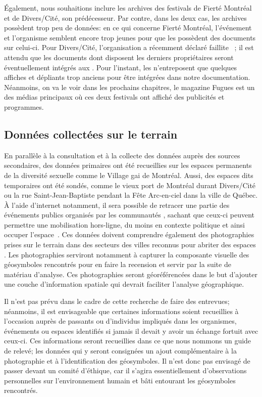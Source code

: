 Également, nous souhaitions inclure les archives des festivals de Fierté Montréal et de Divers/Cité, son prédécesseur. 
Par contre, dans les deux cas, les archives possèdent trop peu de données: en ce qui concerne Fierté Montréal, l'événement et l'organisme semblent encore trop jeunes pour que les \agq{} possèdent des documents sur celui-ci. 
Pour Divers/Cité, l'organisation a récemment déclaré faillite~\citep{Cormier2015} ; il est attendu que les documents dont disposent les derniers propriétaires seront éventuellement intégrés aux \agq{}. 
Pour l'instant, les \agq{} n'entreposent que quelques affiches et dépliants trop anciens pour être intégrées dans notre documentation. 
Néanmoins, on va le voir dans les prochains chapitres, le magazine Fugues est un des médias principaux où ces deux festivals ont affiché des publicités et programmes.

\subsection{Données collectées sur le terrain}
\label{sub:donnees_collectees_sur_le_terrain}
En parallèle à la consultation et à la collecte des données auprès des sources secondaires, des données primaires ont été recueillies sur les espaces permanents de la diversité sexuelle comme le Village gai de Montréal. 
Aussi, des espaces dits temporaires ont été sondés, comme le vieux port de Montréal durant Divers/Cité ou la rue Saint-Jean-Baptiste pendant la Fête Arc-en-ciel dans la ville de Québec. 
À l'aide d'internet notamment, il sera possible de retracer une partie des événements publics organisés par les communautés \lgbt{}, sachant que ceux-ci peuvent permettre une mobilisation hors-ligne, du moins en contexte politique et ainsi occuper l'espace~\citep[153-154]{Mercea2011}. 
Ces données doivent comprendre également des photographies prises sur le terrain dans des secteurs des villes reconnus pour abriter des espaces \qus{}. 
Les photographies serviront notamment à capturer la composante visuelle des géosymboles rencontrés pour en faire la recension et servir par la suite de matériau d'analyse. 
Ces photographies seront géoréférencées dans le but d'ajouter une couche d'information spatiale qui devrait faciliter l'analyse géographique.

Il n'est pas prévu dans le cadre de cette recherche de faire des entrevues; néanmoins, il est envisageable que certaines informations soient recueillies à l'occasion auprès de passants ou d'individus impliqués dans les organismes, événements ou espaces identifiés si jamais il devait y avoir un échange fortuit avec ceux-ci. 
Ces informations seront recueillies dans ce que nous nommons un guide de relevé; les données qui y seront consignées un ajout complémentaire à la photographie et à l'identification des géosymboles. 
Il n'est donc pas envisagé de passer devant un comité d'éthique, car il s'agira essentiellement d'observations personnelles sur l'environnement humain et bâti entourant les géosymboles rencontrés.

